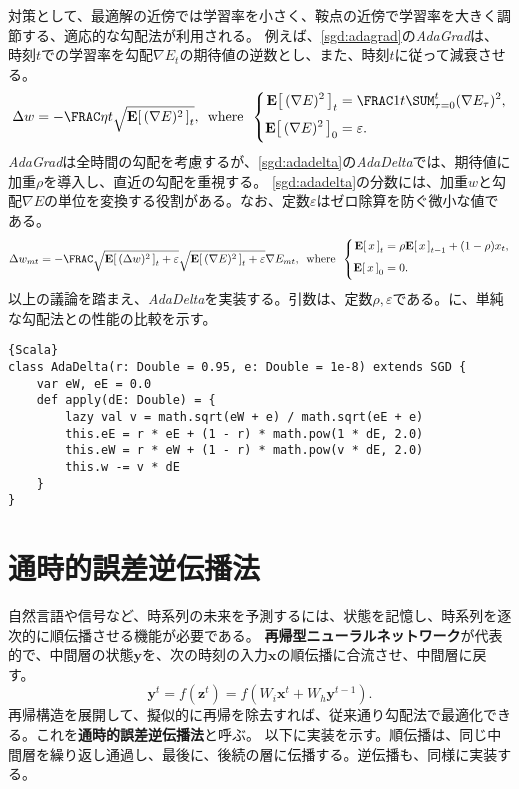 \documentclass[10pt,a4paper]{book}
\begin{document}
対策として、最適解の近傍では学習率を小さく、鞍点の近傍で学習率を大きく調節する、適応的な勾配法が利用される。
例えば、\eqref{sgd:adagrad}の\textit{AdaGrad}は、時刻$t$での学習率を勾配$\nabla E_t$の期待値の逆数とし、また、時刻$t$に従って減衰させる。
%
\begin{equation}
\label{eq:sgd:adagrad}
\Delta w = -\frac{\eta}{t\sqrt{\E{(\nabla E)^2}_t}},
\where
\left\{
\begin{aligned}
\E{(\nabla E)^2}_t &= \frac{1}{t} \sum_{\tau=0}^t (\nabla E_\tau)^2, \\
\E{(\nabla E)^2}_0 &= \varepsilon.
\end{aligned}
\right.
\end{equation}
%
\textit{AdaGrad}は全時間の勾配を考慮するが、\eqref{sgd:adadelta}の\textit{AdaDelta}では、期待値に加重$\rho$を導入し、直近の勾配を重視する。
\eqref{sgd:adadelta}の分数には、加重$w$と勾配$\nabla E$の単位を変換する役割がある。なお、定数$\varepsilon$はゼロ除算を防ぐ微小な値である。
%
\begin{equation}
\label{eq:sgd:adadelta}
\Delta w_{mt} = -\frac{\sqrt{\E{(\Delta w)^2}_t+\varepsilon}}{\sqrt{\E{(\nabla E)^2}_t+\varepsilon}} \nabla E_{mt},
\where
\left\{
\begin{aligned}
\E{x}_t &= \rho \E{x}_{t-1} + (1-\rho) x_t, \\
\E{x}_0 &= 0.
\end{aligned}
\right.
\end{equation}
%
以上の議論を踏まえ、\textit{AdaDelta}を実装する。引数は、定数$\rho,\varepsilon$である。に、単純な勾配法との性能の比較を示す。

\begin{Verbatim}{Scala}
class AdaDelta(r: Double = 0.95, e: Double = 1e-8) extends SGD {
	var eW, eE = 0.0
	def apply(dE: Double) = {
		lazy val v = math.sqrt(eW + e) / math.sqrt(eE + e)
		this.eE = r * eE + (1 - r) * math.pow(1 * dE, 2.0)
		this.eW = r * eW + (1 - r) * math.pow(v * dE, 2.0)
		this.w -= v * dE
	}
}
\end{Verbatim}

\section{通時的誤差逆伝播法}

自然言語や信号など、時系列の未来を予測するには、状態を記憶し、時系列を逐次的に順伝播させる機能が必要である。
\textbf{再帰型ニューラルネットワーク}が代表的で、中間層の状態$\bm{y}$を、次の時刻の入力$\bm{x}$の順伝播に合流させ、中間層に戻す。
%
\begin{equation}
\label{eq:nn:rnn}
\bm{y}^t = f(\bm{z}^t) = f(W_i\bm{x}^t+W_h\bm{y}^{t-1}).
\end{equation}
%
再帰構造を展開して、擬似的に再帰を除去すれば、従来通り勾配法で最適化できる。これを\textbf{通時的誤差逆伝播法}と呼ぶ。
以下に実装を示す。順伝播は、同じ中間層を繰り返し通過し、最後に、後続の層に伝播する。逆伝播も、同様に実装する。
\end{document}

